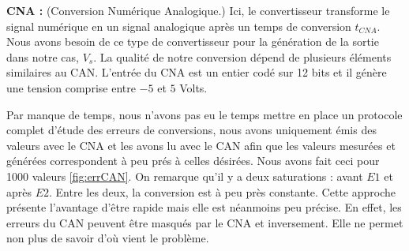 \hspace{3mm} \textbf{CNA :} (Conversion Numérique Analogique.) Ici, le convertisseur transforme le signal numérique en un signal analogique après un temps de conversion $t_{CNA}$. Nous avons besoin de ce type de convertisseur pour la génération de la sortie dans notre cas, $V_{s}$. La qualité de notre conversion dépend de plusieurs éléments similaires au CAN. L'entrée du CNA est un entier codé sur 12 bits et il génère une tension comprise entre $-5$ et $5$ Volts. 


Par manque de temps, nous n'avons pas eu le temps mettre en place un protocole complet d'étude des erreurs de conversions, nous avons uniquement émis des valeurs avec le CNA et les avons lu avec le CAN afin que les valeurs mesurées et générées correspondent à peu prés à celles désirées. Nous avons fait ceci pour 1000 valeurs \ref{fig:errCAN}. On remarque qu'il y a deux saturations : avant $E1$ et après $E2$. Entre les deux, la conversion est à peu près constante. Cette approche présente l'avantage d'être rapide mais elle est néanmoins peu précise. En effet, les erreurs du CAN peuvent être masqués par le CNA et inversement. Elle ne permet non plus de savoir d'où vient le problème. 
